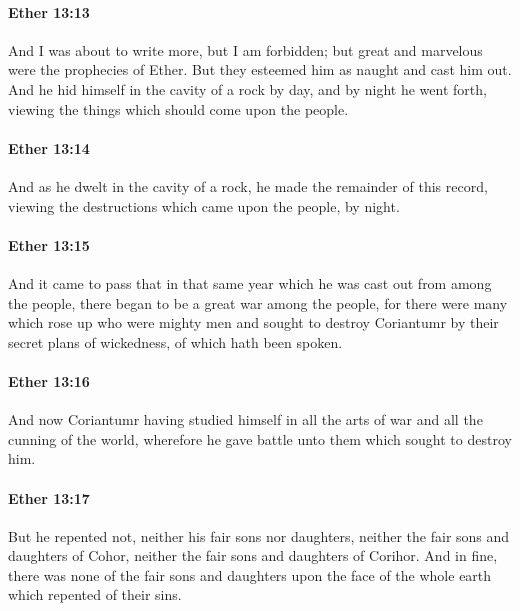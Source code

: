 		\paragraph{Ether 13:13} %
			\label{ETHER-13-13}

			And I was about to write more, but I am forbidden;
			but great and marvelous were the prophecies of Ether.
			But they esteemed him as naught and cast him out.
			And he hid himself in the cavity of a rock by day,
			and by night he went forth,
			viewing the things which should come upon the people.

		\paragraph{Ether 13:14} %
			\label{ETHER-13-14}

			And as he dwelt in the cavity of a rock,
			he made the remainder of this record,
			viewing the destructions which came upon the people,
			by night.

		\paragraph{Ether 13:15} %
			\label{ETHER-13-15}

			And it came to pass that in that same year
			which he was cast out from among the people,
			there began to be a great war among the people,
			for there were many which rose up who were mighty men
			and sought to destroy Coriantumr
			by their secret plans of wickedness, of which hath been spoken.

		\paragraph{Ether 13:16} %
			\label{ETHER-13-16}

			And now Coriantumr having studied himself
			in all the arts of war and all the cunning of the world,
			wherefore he gave battle unto them which sought to destroy him.

		\paragraph{Ether 13:17} %
			\label{ETHER-13-17}

			But he repented not, neither his fair sons nor daughters,
			neither the fair sons and daughters of Cohor,
			neither the fair sons and daughters of Corihor.
			And in fine, there was none of the fair sons and daughters
			upon the face of the whole earth
			which repented of their sins.

